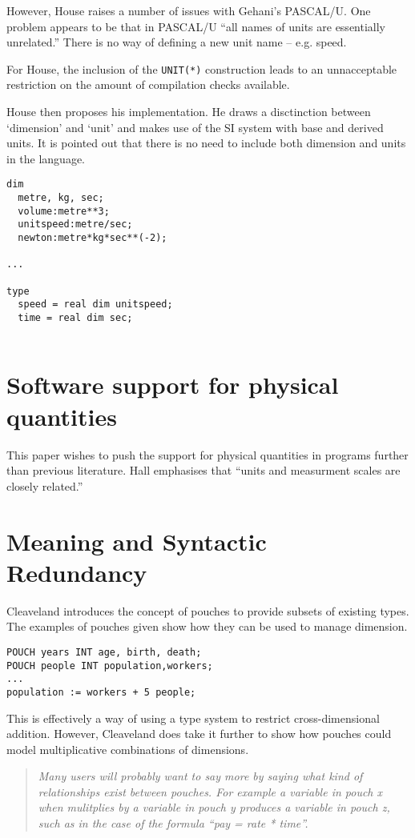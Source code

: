 \documentclass[a4paper]{article}
\newenvironment{myquote}[1]
{\begin{sloppypar}\begin{quote}\small\sbox{\myquoteEnd}{#1}\itshape}
{ \ \\ \hspace*{\fill} \usebox{\myquoteEnd} \end{quote}\end{sloppypar}}
\begin{document}
However, House raises a number of issues with Gehani's PASCAL/U.
One problem appears to be that in PASCAL/U ``all names of units are 
essentially unrelated.'' There is no way of defining a new unit name -- e.g.
speed. 

For House,  the inclusion of the \texttt{UNIT(*)} construction 
leads to an unnacceptable restriction on the amount of compilation checks 
available.

House then proposes his implementation. He draws a disctinction between 
`dimension' and `unit' and makes use of the SI system with base and derived 
units. It is pointed out that there is no need to include both dimension and
units in the language.
\begin{verbatim}
dim
  metre, kg, sec;
  volume:metre**3;
  unitspeed:metre/sec;
  newton:metre*kg*sec**(-2);

...

type
  speed = real dim unitspeed;
  time = real dim sec;
 
\end{verbatim}

\section{Software support for physical quantities \cite{ME_hall}}
This paper wishes to push the support for physical quantities in programs
further than previous literature. Hall emphasises that ``units and 
measurment scales are closely related.''

\section{Meaning and Syntactic Redundancy \cite{ME_cleaveland}}

Cleaveland introduces the concept of pouches to provide subsets of existing
types. The examples of pouches given show how they can be used to manage 
dimension.
\begin{verbatim}
POUCH years INT age, birth, death;
POUCH people INT population,workers;
...
population := workers + 5 people;
\end{verbatim}

This is effectively a way of using a type system to restrict cross-dimensional
addition. However, Cleaveland does take it further to show how pouches could
model multiplicative combinations of dimensions.

\begin{myquote}{\cite{ME_cleaveland}}
Many users will probably want to say more by saying what kind of relationships 
exist between pouches. For example a variable in pouch x when mulitplies by a 
variable in pouch y produces a variable in pouch z, such as in the case of the 
formula ``pay = rate * time''.
\end{myquote}
\end{document}
